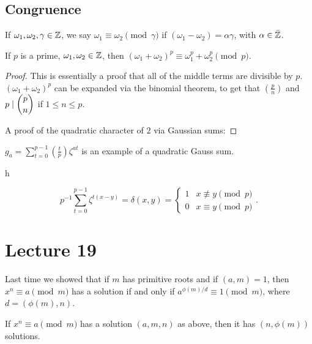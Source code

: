 \documentclass{article}
\begin{document}
\subsection{Congruence} 
If $\omega_1, \omega_2, \gamma \in \mathbb Z$, we say $\omega_1 \equiv \omega_2 \pmod \gamma$ if $(\omega_1 - \omega_2) = \alpha \gamma$, with $\alpha \in \bar{\mathbb Z}$.

\begin{lemma}
	If $p$ is a prime, $\omega_1, \omega_2 \in \mathbb Z$, then $(\omega_1 + \omega_2)^p \equiv \omega_1^p + \omega_2^p \pmod p$.
\end{lemma}

\begin{proof}
	This is essentially a proof that all of the middle terms are divisible by $p$.
	$(\omega_1 + \omega_2)^p$ can be expanded via the binomial theorem, to get 
	that $\left( \frac{p}{n} \right)$ and $p \mid \dbinom{p}{n}$ if $1 \leq n \leq p$.

	A proof of the quadratic character of $2$ via Gaussian sums:
\end{proof}

\begin{definition}
	$g_a = \sum_{t = 0}^{p-1} \left(\frac{t}{p}\right) \zeta^{at}$ is an example of a quadratic Gauss sum.
\end{definition}

\begin{lemma}
	h
\end{lemma}

\begin{corollary}
	\[p^{-1} \sum_{t = 0}^{p - 1} \zeta^{t(x - y)} = \delta(x, y) = \begin{cases} 1 & x \not \equiv y \pmod p \\ 0 & x \equiv y \pmod p \end{cases}.\] 
\end{corollary} 


\section{Lecture 19}
Last time we showed that if $m$ has primitive roots and if $(a, m) = 1$, then $x^n \equiv a \pmod m$ has a solution if and only if $a^{\phi(m)/d} \equiv 1 \pmod m$, where $d = (\phi(m), n)$.

\begin{remark}
    If $x^n \equiv a \pmod m$ has a solution $(a, m, n)$ as above, then it has $(n, \phi(m))$ solutions. 
\end{remark}
\end{document}
